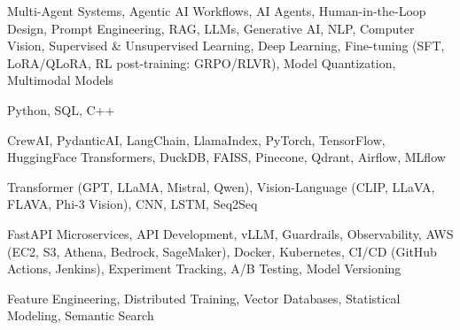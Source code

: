 \documentclass[letter,10pt]{article}
\begin{document}
 Multi-Agent Systems, Agentic AI Workflows, AI Agents, Human-in-the-Loop Design, Prompt Engineering, RAG, LLMs, Generative AI, NLP, Computer Vision, Supervised \& Unsupervised Learning, Deep Learning, Fine-tuning (SFT, LoRA/QLoRA, RL post-training: GRPO/RLVR), Model Quantization, Multimodal Models\par\vspace{2pt}

 Python, SQL, C++\par\vspace{2pt}

 CrewAI, PydanticAI, LangChain, LlamaIndex, PyTorch, TensorFlow, HuggingFace Transformers, DuckDB, FAISS, Pinecone, Qdrant, Airflow, MLflow\par\vspace{2pt}

 Transformer (GPT, LLaMA, Mistral, Qwen), Vision-Language (CLIP, LLaVA, FLAVA, Phi-3 Vision), CNN, LSTM, Seq2Seq\par\vspace{2pt}

 FastAPI Microservices, API Development, vLLM, Guardrails, Observability, AWS (EC2, S3, Athena, Bedrock, SageMaker), Docker, Kubernetes, CI/CD (GitHub Actions, Jenkins), Experiment Tracking, A/B Testing, Model Versioning\par\vspace{2pt}

 Feature Engineering, Distributed Training, Vector Databases, Statistical Modeling, Semantic Search
\end{document}
